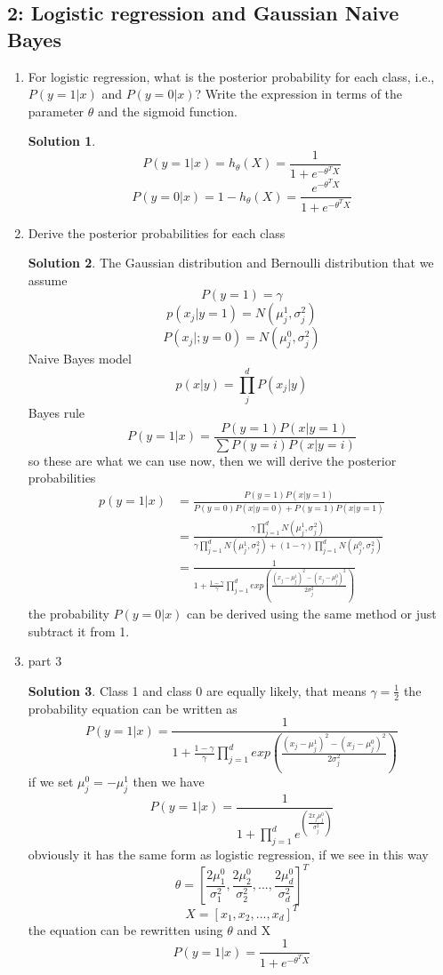 \documentclass[]{book}
\theoremstyle{definition}
\newtheorem*{soln}{Solution}
\begin{document}
\subsection*{2: Logistic regression and Gaussian Naive Bayes }
\begin{enumerate}
	\item  For logistic regression, what is the posterior probability for each class, i.e.,
	$P (y = 1|x)$ and $P (y = 0|x)$? Write the expression in terms of the parameter $\theta$ and the sigmoid function.
	\begin{soln}
		$$P (y = 1|x) = h_{\theta}(X) = \frac{1}{1+e^{-\theta^T X}}$$
		$$P (y = 0|x) = 1 - h_{\theta}(X) = \frac{e^{-\theta^T X}}{1+e^{-\theta^T X}}$$
	\end{soln}
	\item Derive the posterior probabilities for each class
	\begin{soln}
		The Gaussian distribution and Bernoulli distribution that we assume
		$$ P(y = 1) = \gamma$$
		$$ p (x_j|y = 1) = N(\mu_j^1, \sigma_j^2)$$
		$$P(x_j|; y =0) = N(\mu_j^0, \sigma_j^2)$$
		Naive Bayes model
		$$ p(x|y) = \prod_{j}^{d}P(x_j|y)$$
		Bayes rule
		$$P(y = 1|x) = \frac{P(y=1)P(x|y =1)}{\sum P(y = i)P(x|y =i)}$$
		so these are what we can use now, then we will derive the posterior probabilities
		\begin{equation*}
			\begin{split}
			p(y = 1|x)& = \frac{P(y=1)P(x|y =1)}{ P(y = 0)P(x|y =0)+ P(y = 1)P(x|y =1)}\\
				&= \frac{\gamma \prod_{j =1}^{d} N(\mu_j^1, \sigma_j^2)}{\gamma \prod_{j =1}^{d} N(\mu_j^1, \sigma_j^2) + (1 -\gamma) \prod_{j =1}^{d} N(\mu_j^0, \sigma_j^2)}\\
				&=\frac{1}{1+ \frac{1-\gamma}{\gamma} \prod_{j =1}^{d} exp(\frac{(x_j-\mu_j^1)^2 - (x_j-\mu_j^0)^2}{2\sigma_j^2 })}
			\end{split}			
		\end{equation*}
		the probability $P(y = 0|x)$ can be derived using the same method or just subtract it from 1.
	\end{soln}
	\item part 3
	\begin{soln}
			Class 1 and class 0 are equally likely, that means $\gamma = \frac{1}{2}$
			the probability equation can be written as 
			$$P(y = 1|x) =\frac{1}{1+ \frac{1-\gamma}{\gamma} \prod_{j =1}^{d} exp(\frac{(x_j-\mu_j^1)^2 - (x_j-\mu_j^0)^2}{2\sigma_j^2 })}$$
			if we set $ \mu_j^0 = - \mu_j^1$ then we have
			$$P(y = 1|x) = \frac{1}{1+ \prod_{j =1}^{d} e^(\frac{2 x_j \mu_j^0}{\sigma_j^2})}$$
			obviously it has the same form as logistic regression, if we see in this way
			$$ \theta = [ \frac{2\mu_1^0}{\sigma_1^2}, \frac{2\mu_2^0}{\sigma_2^2},...,\frac{2\mu_d^0}{\sigma_d^2}]^T$$
			$$X = [x_1, x_2,...,x_d]^T$$
			the equation can be rewritten using $\theta$ and X
			$$P(y = 1|x) = \frac{1}{1+e^{-\theta^T X}}$$
		
	\end{soln}
\end{enumerate}
\end{document}
